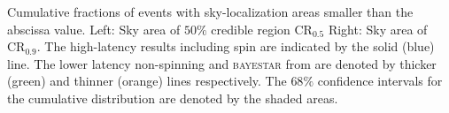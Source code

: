 \label{fig:sky} Cumulative fractions of events with sky-localization areas smaller than the abscissa value. Left: Sky area of $50\%$ credible region $\mathrm{CR}_{0.5}$ Right: Sky area of $\mathrm{CR}_{0.9}$. The high-latency results including spin are indicated by the solid (blue) line. The lower latency non-spinning and \textsc{bayestar} from \citet{Singer_2014} are denoted by thicker (green) and thinner (orange) lines respectively. The $68\%$ confidence intervals for the cumulative distribution are denoted by the shaded areas.
  